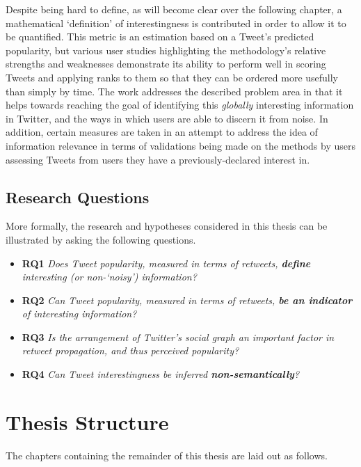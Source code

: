 Despite being hard to define, as will become clear over the following chapter, a mathematical `definition' of interestingness is contributed in order to allow it to be quantified. This metric is an estimation based on a Tweet's predicted popularity, but various user studies highlighting the methodology's relative strengths and weaknesses demonstrate its ability to perform well in scoring Tweets and applying ranks to them so that they can be ordered more usefully than simply by time. The work addresses the described problem area in that it helps towards reaching the goal of identifying this \textit{globally} interesting information in Twitter, and the ways in which users are able to discern it from noise. In addition, certain measures are taken in an attempt to address the idea of information relevance in terms of validations being made on the methods by users assessing Tweets from users they have a previously-declared interest in.



\subsection{Research Questions}
\label{section:research_questions}
More formally, the research and hypotheses considered in this thesis can be illustrated by asking the following questions.
\begin{itemize}
    \item \textbf{RQ1} \textit{Does Tweet popularity, measured in terms of retweets, \textbf{define} interesting (or non-`noisy') information?}
    \item \textbf{RQ2} \textit{Can Tweet popularity, measured in terms of retweets, \textbf{be an indicator} of interesting information?}
    \item \textbf{RQ3} \textit{Is the arrangement of Twitter's social graph an important factor in retweet propagation, and thus perceived popularity?}
    \item \textbf{RQ4} \textit{Can Tweet interestingness be inferred \textbf{non-semantically}?}
\end{itemize} 


\section{Thesis Structure}
The chapters containing the remainder of this thesis are laid out as follows.

